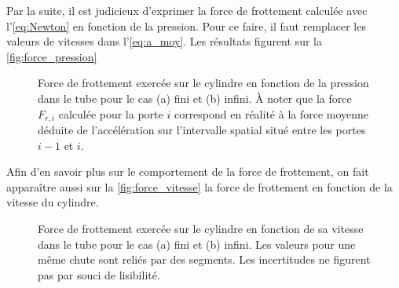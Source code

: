 \documentclass[a4paper, 12pt,oneside]{article}
\begin{document}
\noindent Par la suite, il est judicieux d'exprimer la force de frottement calculée avec l'\autoref{eq:Newton} en fonction de la pression. Pour ce faire, il faut remplacer les valeurs de vitesses dans l'\autoref{eq:a_moy}. Les résultats figurent sur la \autoref{fig:force_pression}

\begin{figure}[h!]
    \centering
    \begin{subfigure}[b]{0.48\textwidth}
        \centering
        \caption{}
        \label{fig:f_vs_p_fini}
    \end{subfigure}
    \hfill 
    \begin{subfigure}[b]{0.48\textwidth}
        \centering
        \caption{}
        \label{fig:f_vs_p_inf}
    \end{subfigure}
    
    \caption{Force de frottement exercée sur le cylindre en fonction de la pression dans le tube pour le cas (a) fini et (b) infini. À noter que la force $F_{r,i}$ calculée pour la porte $i$ correspond en réalité à la force moyenne déduite de l'accélération sur l'intervalle spatial situé entre les portes $i-1$ et $i$.}
    \label{fig:force_pression}
\end{figure}

\noindent Afin d'en savoir plus sur le comportement de la force de frottement, on fait apparaître aussi sur la \autoref{fig:force_vitesse} la force de frottement en fonction de la vitesse du cylindre. 

\begin{figure}[h!]
    \centering
    \begin{subfigure}[b]{0.48\textwidth}
        \centering
        \caption{}
        \label{fig:f_vs_v_fini}
    \end{subfigure}
    \hfill 
    \begin{subfigure}[b]{0.48\textwidth}
        \centering
        \caption{}
        \label{fig:f_vs_v_inf}
    \end{subfigure}
    
    \caption{Force de frottement exercée sur le cylindre en fonction de sa vitesse dans le tube pour le cas (a) fini et (b) infini. Les valeurs pour une même chute sont reliés par des segments. Les incertitudes ne figurent pas par souci de lisibilité.}
    \label{fig:force_vitesse}
\end{figure}
\end{document}
